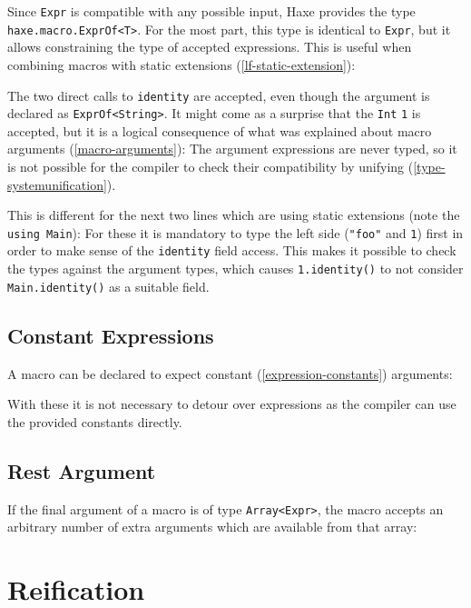 \documentclass[a4paper,oneside]{book}
\newcommand{\type}[1]{\texttt{#1}}
\newcommand{\expr}[1]{\texttt{#1}}
\newcommand{\tref}[2]{#1 (\ref{#2})}
\newcommand{\haxe}[2][]{%
}
\begin{document}
Since \type{Expr} is compatible with any possible input, Haxe provides the type \type{haxe.macro.ExprOf<T>}. For the most part, this type is identical to \type{Expr}, but it allows constraining the type of accepted expressions. This is useful when combining macros with \tref{static extensions}{lf-static-extension}:

\haxe{assets/ExprOf.hx}

The two direct calls to \expr{identity} are accepted, even though the argument is declared as \expr{ExprOf<String>}. It might come as a surprise that the \type{Int} \expr{1} is accepted, but it is a logical consequence of what was explained about \tref{macro arguments}{macro-arguments}: The argument expressions are never typed, so it is not possible for the compiler to check their compatibility by \tref{unifying}{type-systemunification}.

This is different for the next two lines which are using static extensions (note the \expr{using Main}): For these it is mandatory to type the left side (\expr{"foo"} and \expr{1}) first in order to make sense of the \expr{identity} field access. This makes it possible to check the types against the argument types, which causes \expr{1.identity()} to not consider \expr{Main.identity()} as a suitable field.

\subsection{Constant Expressions}
\label{macro-constant-arguments}

A macro can be declared to expect \tref{constant}{expression-constants} arguments:

\haxe{assets/MacroArgumentsConst.hx}

With these it is not necessary to detour over expressions as the compiler can use the provided constants directly.

\subsection{Rest Argument}
\label{macro-rest-argument}

If the final argument of a macro is of type \type{Array<Expr>}, the macro accepts an arbitrary number of extra arguments which are available from that array:

\haxe{assets/MacroArgumentsRest.hx}




\section{Reification}
\label{macro-reification}
\end{document}
